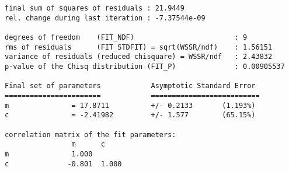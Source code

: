     \begin{verbatim}
final sum of squares of residuals : 21.9449
rel. change during last iteration : -7.37544e-09

degrees of freedom    (FIT_NDF)                        : 9
rms of residuals      (FIT_STDFIT) = sqrt(WSSR/ndf)    : 1.56151
variance of residuals (reduced chisquare) = WSSR/ndf   : 2.43832
p-value of the Chisq distribution (FIT_P)              : 0.00905537

Final set of parameters            Asymptotic Standard Error
=======================            ==========================
m               = 17.8711          +/- 0.2133       (1.193%)
c               = -2.41982         +/- 1.577        (65.15%)

correlation matrix of the fit parameters:
                m      c      
m               1.000 
c              -0.801  1.000 
    \end{verbatim}